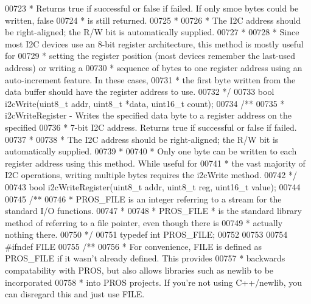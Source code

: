 \begin{DoxyCode}
00723 \textcolor{comment}{ * Returns true if successful or false if failed. If only smoe bytes could be written, false}
00724 \textcolor{comment}{ * is still returned.}
00725 \textcolor{comment}{ *}
00726 \textcolor{comment}{ * The I2C address should be right-aligned; the R/W bit is automatically supplied.}
00727 \textcolor{comment}{ *}
00728 \textcolor{comment}{ * Since most I2C devices use an 8-bit register architecture, this method is mostly useful for}
00729 \textcolor{comment}{ * setting the register position (most devices remember the last-used address) or writing a}
00730 \textcolor{comment}{ * sequence of bytes to one register address using an auto-increment feature. In these cases,}
00731 \textcolor{comment}{ * the first byte written from the data buffer should have the register address to use.}
00732 \textcolor{comment}{ */}
00733 \textcolor{keywordtype}{bool} i2cWrite(uint8\_t addr, uint8\_t *data, uint16\_t count);
00734 \textcolor{comment}{/**}
00735 \textcolor{comment}{ * i2cWriteRegister - Writes the specified data byte to a register address on the specified}
00736 \textcolor{comment}{ * 7-bit I2C address. Returns true if successful or false if failed.}
00737 \textcolor{comment}{ *}
00738 \textcolor{comment}{ * The I2C address should be right-aligned; the R/W bit is automatically supplied.}
00739 \textcolor{comment}{ *}
00740 \textcolor{comment}{ * Only one byte can be written to each register address using this method. While useful for}
00741 \textcolor{comment}{ * the vast majority of I2C operations, writing multiple bytes requires the i2cWrite method.}
00742 \textcolor{comment}{ */}
00743 \textcolor{keywordtype}{bool} i2cWriteRegister(uint8\_t addr, uint8\_t reg, uint16\_t value);
00744 
00745 \textcolor{comment}{/**}
00746 \textcolor{comment}{ * PROS\_FILE is an integer referring to a stream for the standard I/O functions.}
00747 \textcolor{comment}{ *}
00748 \textcolor{comment}{ * PROS\_FILE * is the standard library method of referring to a file pointer, even though there is}
00749 \textcolor{comment}{ * actually nothing there.}
00750 \textcolor{comment}{ */}
00751 \textcolor{keyword}{typedef} \textcolor{keywordtype}{int} PROS_FILE;
00752 
00753 
00754 \textcolor{preprocessor}{#}\textcolor{preprocessor}{ifndef} \textcolor{preprocessor}{FILE}
00755 \textcolor{comment}{/**}
00756 \textcolor{comment}{ * For convenience, FILE is defined as PROS\_FILE if it wasn't already defined. This provides}
00757 \textcolor{comment}{ * backwards compatability with PROS, but also allows libraries such as newlib to be incorporated}
00758 \textcolor{comment}{ * into PROS projects. If you're not using C++/newlib, you can disregard this and just use FILE.}

\end{DoxyCode}
